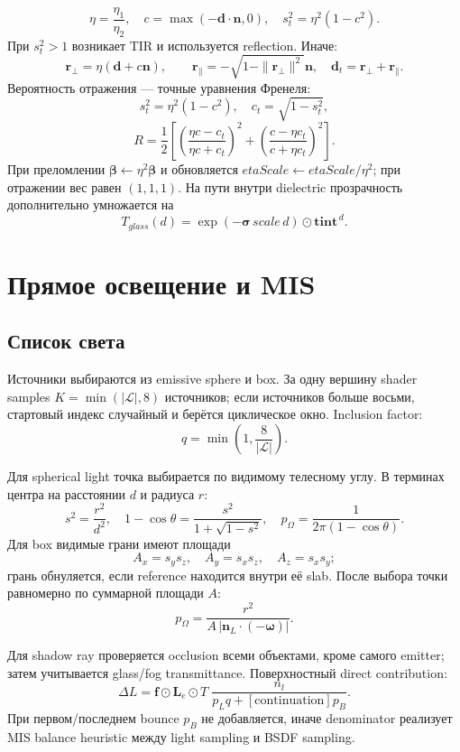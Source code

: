 \documentclass[11pt,a4paper]{article}
\newcommand{\vect}[1]{\boldsymbol{#1}}
\begin{document}
\[
 \eta=\frac{\eta_1}{\eta_2},\quad
 c=\max(-\vect d\cdot\vect n,0),\quad
 s_t^2=\eta^2(1-c^2).
\]
При $s_t^2>1$ возникает TIR и используется reflection. Иначе:
\[
 \vect r_\perp=\eta(\vect d+c\vect n),\qquad
 \vect r_\parallel=-\sqrt{1-\|\vect r_\perp\|^2}\vect n,
 \quad \vect d_t=\vect r_\perp+\vect r_\parallel.
\]
Вероятность отражения --- точные уравнения Френеля:
\[
 s_t^2=\eta^2(1-c^2),\quad c_t=\sqrt{1-s_t^2},
\]
\[
 R=\frac12\left[
 \left(\frac{\eta c-c_t}{\eta c+c_t}\right)^2+
 \left(\frac{c-\eta c_t}{c+\eta c_t}\right)^2\right].
\]
При преломлении $\vect\beta\leftarrow\eta^2\vect\beta$ и обновляется
$etaScale\leftarrow etaScale/\eta^2$; при отражении вес равен $(1,1,1)$.
На пути внутри dielectric прозрачность дополнительно умножается на
\[
 T_{glass}(d)=\exp(-\vect\sigma\,scale\,d)\odot
 \vect{tint}^{\,d}.
\]

\section{Прямое освещение и MIS}

\subsection{Список света}

Источники выбираются из emissive sphere и box. За одну вершину shader samples
$K=\min(|\mathcal L|,8)$ источников; если источников больше восьми, стартовый индекс
случайный и берётся циклическое окно. Inclusion factor:
\[
 q=\min\left(1,\frac{8}{|\mathcal L|}\right).
\]

Для spherical light точка выбирается по видимому телесному углу. В терминах центра
на расстоянии $d$ и радиуса $r$:
\[
 s^2=\frac{r^2}{d^2},\quad 1-\cos\theta=\frac{s^2}{1+\sqrt{1-s^2}},
 \quad p_\Omega=\frac{1}{2\pi(1-\cos\theta)}.
\]
Для box видимые грани имеют площади
\[
 A_x=s_ys_z,\quad A_y=s_xs_z,\quad A_z=s_xs_y;
\]
грань обнуляется, если reference находится внутри её slab. После выбора точки
равномерно по суммарной площади $A$:
\[
 p_\Omega=\frac{r^2}{A\,|\vect n_L\cdot(-\vect\omega)|}.
\]

Для shadow ray проверяется occlusion всеми объектами, кроме самого emitter; затем
учитывается glass/fog transmittance. Поверхностный direct contribution:
\[
 \Delta L=\vect f\odot\vect L_e\odot T\;
 \frac{n_l}{p_Lq+[\text{continuation}]p_B}.
\]
При первом/последнем bounce $p_B$ не добавляется, иначе denominator реализует
MIS balance heuristic между light sampling и BSDF sampling.
\end{document}
